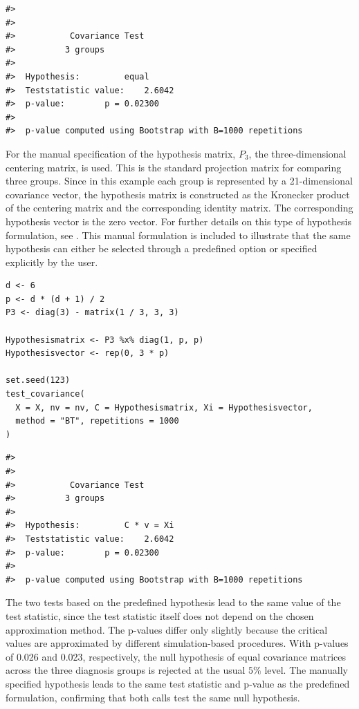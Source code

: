 \begin{verbatim}
#> 
#> 
#>           Covariance Test 
#>          3 groups
#> 
#>  Hypothesis:         equal
#>  Teststatistic value:    2.6042
#>  p-value:        p = 0.02300
#>  
#>  p-value computed using Bootstrap with B=1000 repetitions
\end{verbatim}

For the manual specification of the hypothesis matrix, \(P_3\), the
three-dimensional centering matrix, is used. This is the standard projection
matrix for comparing three groups. Since in this example each group is
represented by a 21-dimensional covariance vector, the hypothesis matrix is
constructed as the Kronecker product of the centering matrix and the
corresponding identity matrix. The corresponding hypothesis vector is the zero
vector. For further details on this type of hypothesis formulation, see
\citet{sattler2018}. This manual formulation is included to illustrate that
the same hypothesis can either be selected through a predefined option or
specified explicitly by the user.

\begin{verbatim}
d <- 6
p <- d * (d + 1) / 2
P3 <- diag(3) - matrix(1 / 3, 3, 3)

Hypothesismatrix <- P3 %x% diag(1, p, p)
Hypothesisvector <- rep(0, 3 * p)

set.seed(123)
test_covariance(
  X = X, nv = nv, C = Hypothesismatrix, Xi = Hypothesisvector,
  method = "BT", repetitions = 1000
)
\end{verbatim}

\begin{verbatim}
#> 
#> 
#>           Covariance Test 
#>          3 groups
#> 
#>  Hypothesis:         C * v = Xi
#>  Teststatistic value:    2.6042
#>  p-value:        p = 0.02300
#>  
#>  p-value computed using Bootstrap with B=1000 repetitions
\end{verbatim}

The two tests based on the predefined hypothesis lead to the same value of the
test statistic, since the test statistic itself does not depend on the chosen
approximation method. The p-values differ only slightly because the critical
values are approximated by different simulation-based procedures. With p-values
of 0.026 and 0.023, respectively, the null hypothesis of equal covariance
matrices across the three diagnosis groups is rejected at the usual
\(5\%\) level. The manually specified hypothesis leads to the same test statistic and
p-value as the predefined formulation, confirming that both calls test the same
null hypothesis.

